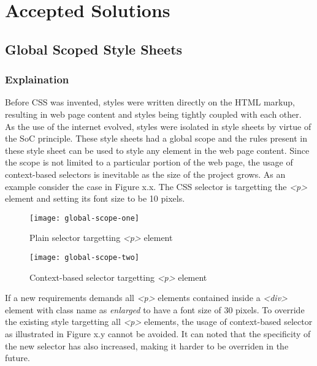 \documentclass[12pt]{article}
\begin{document}
\section{Accepted Solutions}
\subsection{Global Scoped Style Sheets}
\subsubsection{Explaination}
Before CSS was invented, styles were written directly on the HTML markup, resulting in web page content and styles being tightly coupled with each other. As the use of the internet evolved, styles were isolated in style sheets by virtue of the SoC principle. These style sheets had a global scope and the rules present in these style sheet can be used to style any element in the web page content. Since the scope is not limited to a particular portion of the web page, the usage of context-based selectors is inevitable as the size of the project grows. As an example consider the case in Figure x.x. The CSS selector is targetting the \textit{<p>} element and setting its font size to be 10 pixels.

\vspace{0.5cm}

\begin{figure}[h]
\texttt{[image: global-scope-one]}
\centering
\caption{Plain selector targetting \textit{<p>} element}
\end{figure}

\vspace{0.5cm}

\begin{figure}[h]
\texttt{[image: global-scope-two]}
\centering
\caption{Context-based selector targetting \textit{<p>} element}
\end{figure}

\vspace{0.5cm}

If a new requirements demands all \textit{<p>} elements contained inside a \textit{<div>} element with class name as \textit{enlarged} to have a font size of 30 pixels. To override the existing style targetting all \textit{<p>} elements, the usage of  context-based selector as illustrated in Figure x.y cannot be avoided. It can noted that the specificity of the new selector has also increased, making it harder to be overriden in the future. 
\end{document}
